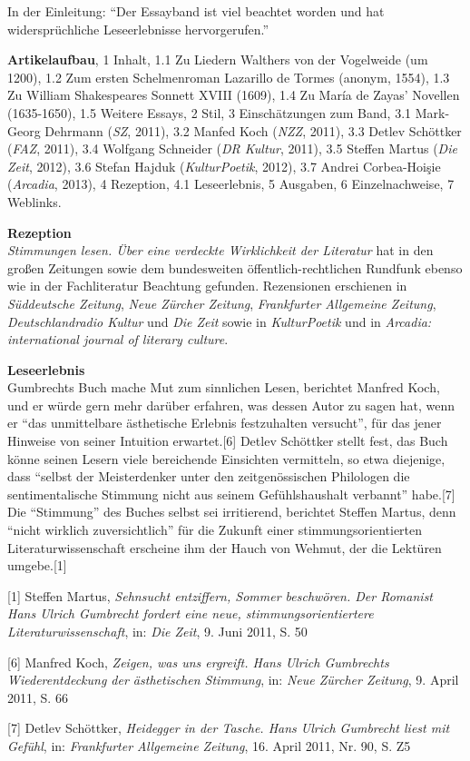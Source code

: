 \documentclass[fontsize=12pt]{scrartcl}
\begin{document}
In der Einleitung: "`Der Essayband ist viel beachtet worden und hat widerspr\"uchliche Leseerlebnisse hervorgerufen."'

\textbf{Artikelaufbau}, 1 Inhalt, 1.1 Zu Liedern Walthers von der Vogelweide (um 1200), 1.2 Zum ersten Schelmenroman Lazarillo de Tormes (anonym, 1554), 1.3 Zu William Shakespeares Sonnett XVIII (1609), 1.4 Zu Mar\'{i}a de Zayas' Novellen (1635-1650), 1.5 Weitere Essays, 2 Stil, 3 Einsch\"atzungen zum Band, 3.1 Mark-Georg Dehrmann (\textit{SZ}, 2011), 3.2 Manfed Koch (\textit{NZZ}, 2011), 3.3 Detlev Sch\"ottker (\textit{FAZ}, 2011), 3.4 Wolf\-gang Schnei\-der (\textit{DR Kultur}, 2011), 3.5 Steffen Martus (\textit{Die Zeit}, 2012), 3.6 Stefan Hajduk (\textit{KulturPoetik}, 2012), 3.7 Andrei Corbea-Hoi{\c s}ie (\textit{Arcadia}, 2013), 4 Rezeption, 4.1 Leseerlebnis, 5 Ausgaben, 6 Einzelnachweise, 7 Weblinks.

\textbf{Rezeption}\\
\textit{Stimmungen lesen. \"Uber eine verdeckte Wirklichkeit der Li\-te\-ra\-tur} hat in den gro{\ss}en Zeitungen sowie dem bundeswei\-ten \"of\-fent\-lich-recht\-li\-chen Rundfunk ebenso wie in der Fach\-li\-te\-ra\-tur Beachtung gefunden. Rezensionen erschienen in \textit{S\"uddeutsche Zeitung}, \textit{Neue Z\"urcher Zeitung}, \textit{Frankfurter Allgemeine Zeitung}, \textit{Deutschlandradio Kultur} und \textit{Die Zeit} sowie in \textit{KulturPoetik} und in \textit{Arcadia: international journal of literary culture}.

\textbf{Leseerlebnis}\\
Gumbrechts Buch mache Mut zum sinnlichen Lesen, berichtet Manfred Koch, und er w\"urde gern mehr dar\"uber erfahren, was dessen Autor zu sagen hat, wenn er "`das unmittelbare \"asthetische Erlebnis festzuhalten versucht"', f\"ur das jener Hinweise von seiner Intuition erwartet.[6] Detlev Sch\"ottker stellt fest, das Buch k\"onne seinen Lesern viele bereichende Einsichten vermitteln, so etwa diejenige, dass "`\mbox{selbst} der Meisterdenker unter den zeitgen\"ossischen Philologen die sentimentalische Stimmung nicht aus seinem Gef\"uhlshaushalt verbannt"' habe.[7] Die "`Stimmung"' des Buches \mbox{selbst} sei irritierend, berichtet Steffen Martus, denn "`nicht wirklich zuversichtlich"' f\"ur die Zukunft einer \flq stimmungsorientierten\frq\,\,Li\-te\-ra\-tur\-wissenschaft erscheine ihm der Hauch von Wehmut, der die Lekt\"uren umgebe.[1]

{\tiny[1] Steffen Martus, \textit{Sehnsucht entziffern, Sommer beschw\"oren. Der Romanist Hans Ulrich Gumbrecht fordert eine neue, \flq stimmungsorientiertere\frq \,\,Li\-te\-ra\-tur\-wissenschaft}, in: \textit{Die Zeit}, 9. Juni 2011, S. 50\par}
{\tiny[6] Manfred Koch, \textit{Zeigen, was uns ergreift. Hans Ulrich Gumbrechts Wiederentdeckung der \"asthetischen Stimmung}, in: \textit{Neue Z\"urcher Zeitung}, 9. April 2011, S. 66\par}
{\tiny[7] Detlev Sch\"ottker, \textit{Heidegger in der Tasche. Hans Ulrich Gumbrecht liest mit Gef\"uhl}, in: \textit{Frankfurter Allgemeine Zeitung}, 16. April 2011, Nr. 90, S. Z5\par}
\end{document}
